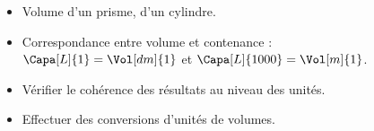 \begin{prerequis}    
    \begin{itemize}        
        \item[\emoji{red-heart}] Volume d'un prisme, d'un cylindre.
        \item[\emoji{red-heart}] Correspondance entre volume et contenance :\\ $\Capa[L]{1} =\Vol[dm]{1}$ et $\Capa[L]{1000} =\Vol[m]{1}$.
        \item[\emoji{diamond-suit}] Vérifier le cohérence des résultats au niveau des unités.
        \item[\emoji{diamond-suit}] Effectuer des conversions d'unités de volumes.
    \end{itemize}
\end{prerequis}